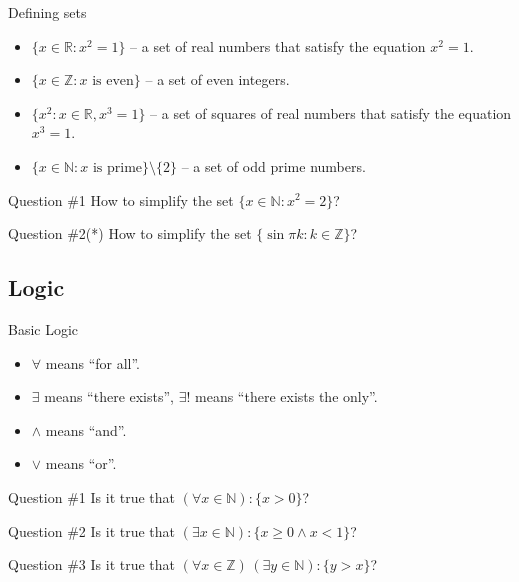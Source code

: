 \documentclass{beamer}
\begin{document}
    \begin{frame}{Defining sets}
      \begin{example}
        \begin{itemize}
          \item $\{x \in \mathbb{R}: x^2 = 1\}$ -- a set of real numbers that satisfy the equation $x^2 = 1$.\pause
          \item $\{x \in \mathbb{Z}: x \text{ is even}\}$ -- a set of even integers.\pause
          \item $\{x^2: x \in \mathbb{R}, x^3 = 1\}$ -- a set of squares of real numbers that satisfy the equation $x^3 = 1$.\pause
          \item $\{x \in \mathbb{N}: x \text{ is prime}\} \setminus \{2\}$ -- a set of odd prime numbers.\pause
        \end{itemize}
      \end{example}

      \begin{alertblock}{Question \#1}
        How to simplify the set $\{x \in \mathbb{N}: x^2 = 2\}$?
      \end{alertblock}
      \pause
      \begin{alertblock}{Question \#2(*)}
        How to simplify the set $\{\sin \pi k: k \in \mathbb{Z}\}$?
      \end{alertblock}
    \end{frame}

    \subsection{Logic}
    \begin{frame}{Basic Logic}
        \begin{itemize}
          \item $\forall$ means ``for all''.
          \item $\exists$ means ``there exists'', $\exists!$ means ``there exists the only''.
          \item $\land$ means ``and''.
          \item $\lor$ means ``or''.
        \end{itemize}
        \pause
        \begin{alertblock}{Question \#1}
            Is it true that $(\forall x \in \mathbb{N}): \{x > 0\}$?
        \end{alertblock}
        \pause
        \begin{alertblock}{Question \#2}
            Is it true that $(\exists x \in \mathbb{N}): \{x \geq 0 \land x < 1\}$?
        \end{alertblock}
        \pause
        \begin{alertblock}{Question \#3}
            Is it true that $(\forall x \in \mathbb{Z})\, (\exists y \in \mathbb{N}): \{y > x\}$?
        \end{alertblock}
    \end{frame}
\end{document}
